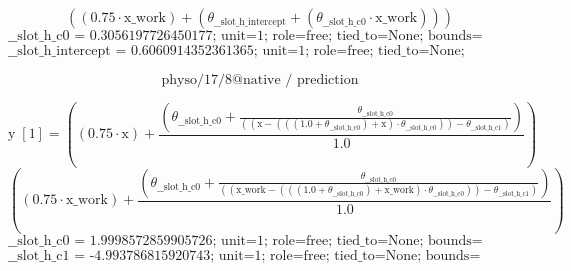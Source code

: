 \[\left(\left(0.75 \cdot \text{x\_work}\right) + \left(\theta_{\text{\_\_slot\_h\_intercept}} + \left(\theta_{\text{\_\_slot\_h\_c0}} \cdot \text{x\_work}\right)\right)\right)\]
\[\text{\_\_slot\_h\_c0 = 0.3056197726450177; unit=1; role=free; tied\_to=None; bounds=[None, None]; origin=native\_regression\_solve}\]
\[\text{\_\_slot\_h\_intercept = 0.6060914352361365; unit=1; role=free; tied\_to=None; bounds=[None, None]; origin=native\_regression\_solve}\]
\noindent {}\par
\noindent {}\par
\noindent {}\par
\noindent {}\par
\[\text{physo/17/8@native / prediction}\]
\noindent {}\par
\[\text{y}\;[\text{1}] = \left(\left(0.75 \cdot \text{x}\right) + \frac{\left(\theta_{\text{\_\_slot\_h\_c0}} + \frac{\theta_{\text{\_\_slot\_h\_c0}}}{\left(\left(\text{x} - \left(\left(\left(1.0 + \theta_{\text{\_\_slot\_h\_c0}}\right) + \text{x}\right) \cdot \theta_{\text{\_\_slot\_h\_c0}}\right)\right) - \theta_{\text{\_\_slot\_h\_c1}}\right)}\right)}{1.0}\right)\]
\[\left(\left(0.75 \cdot \text{x\_work}\right) + \frac{\left(\theta_{\text{\_\_slot\_h\_c0}} + \frac{\theta_{\text{\_\_slot\_h\_c0}}}{\left(\left(\text{x\_work} - \left(\left(\left(1.0 + \theta_{\text{\_\_slot\_h\_c0}}\right) + \text{x\_work}\right) \cdot \theta_{\text{\_\_slot\_h\_c0}}\right)\right) - \theta_{\text{\_\_slot\_h\_c1}}\right)}\right)}{1.0}\right)\]
\[\text{\_\_slot\_h\_c0 = 1.9998572859905726; unit=1; role=free; tied\_to=None; bounds=[None, None]; origin=native\_free\_constant\_slot}\]
\[\text{\_\_slot\_h\_c1 = -4.993786815920743; unit=1; role=free; tied\_to=None; bounds=[None, None]; origin=native\_free\_constant\_slot}\]
\noindent {}\par
\noindent {}\par
\noindent {}\par
